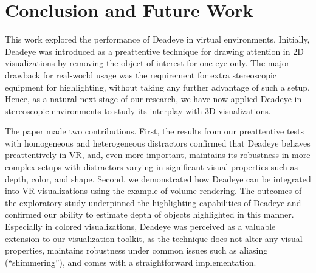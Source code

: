 \documentclass[journal]{vgtc}                %
\begin{document}


\section{Conclusion and Future Work}

This work explored the performance of Deadeye in virtual environments. Initially, Deadeye was introduced as a preattentive technique for drawing attention in 2D visualizations by removing the object of interest for one eye only. The major drawback for real-world usage was the requirement for extra stereoscopic equipment for highlighting, without taking any further advantage of such a setup. Hence, as a natural next stage of our research, we have now applied Deadeye in stereoscopic environments to study its interplay with 3D visualizations.

The paper made two contributions. First, the results from our preattentive tests with homogeneous and heterogeneous distractors confirmed that Deadeye behaves preattentively in VR, and, even more important, maintains its robustness in more complex setups with distractors varying in significant visual properties such as depth, color, and shape. Second, we demonstrated how Deadeye can be integrated into VR visualizations using the example of volume rendering. The outcomes of the exploratory study underpinned the highlighting capabilities of Deadeye and confirmed our ability to estimate depth of objects highlighted in this manner. Especially in colored visualizations, Deadeye was perceived as a valuable extension to our visualization toolkit, as the technique does not alter any visual properties, maintains robustness under common issues such as aliasing (``shimmering''), and comes with a straightforward implementation.
\end{document}
